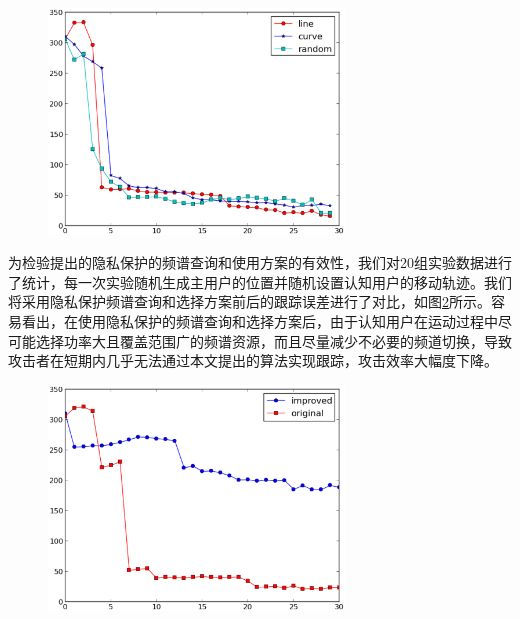 \begin{figure}[!htp]\label{fig:diverse-pattern}
  \centering
  \includegraphics[width=0.7\textwidth]{figures/chap5/diversity}
\end{figure}

为检验提出的隐私保护的频谱查询和使用方案的有效性，我们对20组实验数据进行了统计，每一次实验随机生成主用户的位置并随机设置认知用户的移动轨迹。我们将采用隐私保护频谱查询和选择方案前后的跟踪误差进行了对比，如图\ref{fig:countermeasure}所示。容易看出，在使用隐私保护的频谱查询和选择方案后，由于认知用户在运动过程中尽可能选择功率大且覆盖范围广的频谱资源，而且尽量减少不必要的频道切换，导致
攻击者在短期内几乎无法通过本文提出的算法实现跟踪，攻击效率大幅度下降。

\begin{figure}[!htp]\label{fig:countermeasure}
  \centering
  \includegraphics[width=0.7\textwidth]{figures/chap5/countermeasure}
\end{figure}